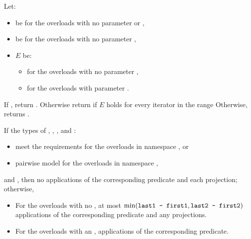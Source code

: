 \begin{itemdescr}
\pnum
Let:
\begin{itemize}
\item {} be  for the overloads with no parameter  or ,

\item {} be  for the overloads with no parameter ,

\item $E$ be:
\begin{itemize}
\item {} for the overloads with no parameter ,
\item {} for the overloads with parameter .
\end{itemize}
\end{itemize}

\pnum
\returns
If
,
return
.
Otherwise return
if $E$ holds for every iterator
in the range 
Otherwise, returns
.

\pnum
\complexity
If the types of , , , and :
\begin{itemize}
\item meet the 
  requirements
  for the overloads in namespace , or
\item pairwise model  for the
overloads in namespace ,
\end{itemize}
and
,
then
no applications of the corresponding predicate and each projection; otherwise,
\begin{itemize}
\item
For the overloads with no ,
at most
$\min(\texttt{last1 - first1}, \texttt{last2 - first2})$
applications of the corresponding predicate and any projections.

\item
For the overloads with an ,
 applications
of the corresponding predicate.
\end{itemize}
\end{itemdescr}

